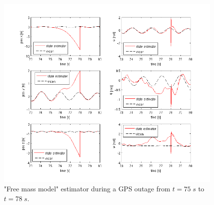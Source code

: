 \begin{figure}[hb]
\centering
\includegraphics[width=1\textwidth]{pictures/2_2_fmm_SNR5_detail_GPSoutage.png}
\caption{"Free mass model" estimator during a GPS outage from $t=75\;s$ to $t=78\;s$.}
\label{detail_fmm_outage}
\end{figure}

\FloatBarrier

